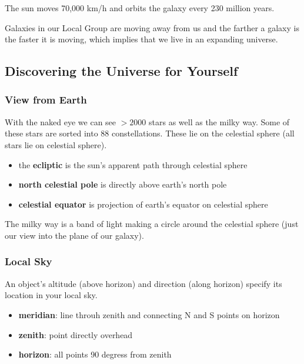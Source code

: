 \documentclass[12pt]{article}
\begin{document}
The sun moves 70,000 km/h and orbits the galaxy every 230 million years.

Galaxies in our Local Group are moving away from us and the farther a galaxy is the faster it is moving, which implies that we live in an expanding universe.

\subsection{Discovering the Universe for Yourself}
\subsubsection{View from Earth}
With the naked eye we can see $>2000$ stars as well as the milky way. Some of these stars are sorted into 88 constellations. These lie on the celestial sphere (all stars lie on celestial sphere).
\begin{itemize}
\item the \textbf{ecliptic} is the sun's apparent path through celestial sphere
\item \textbf{north celestial pole} is directly above earth's north pole
\item \textbf{celestial equator} is projection of earth's equator on celestial sphere
\end{itemize}
The milky way is a band of light making a circle around the celestial sphere (just our view into the plane of our galaxy).

\subsubsection{Local Sky}
An object's altitude (above horizon) and direction (along horizon) specify its location in your local sky.
\begin{itemize}
\item \textbf{meridian}: line throuh zenith and connecting N and S points on horizon
\item \textbf{zenith}: point directly overhead
\item \textbf{horizon}: all points 90 degress from zenith
\end{itemize}
\end{document}
